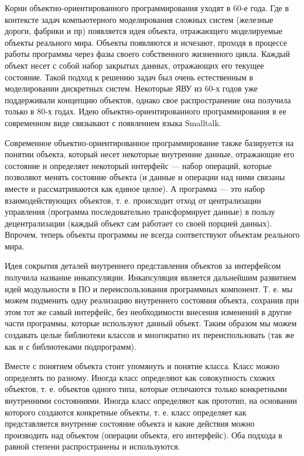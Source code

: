 Корни объектно-ориентированного программирования уходят в 60-е года. Где в контексте задач компьютерного моделирования сложных систем (железные дороги, фабрики и пр) появляется идея объекта, отражающего моделируемые объекты реального мира. Объекты появляются и исчезают, проходя в процессе работы программы через фазы своего собственного жизненного цикла. Каждый объект несет с собой набор закрытых данных, отражающих его текущее состояние. Такой подход к решению задач был очень естественным в моделировании дискретных систем. Некоторые ЯВУ из 60-х годов уже поддерживали концепцию объектов, однако свое распространение она получила только в 80-х годах. Идею объектно-ориентированного программирования в ее современном виде связывают с появлением языка Smalltalk.

Современное объектно-ориентированное программирование также базируется на понятии объекта, который несет некоторые внутренние данные, отражающие его состояние и определяет некоторый интерфейс — набор операций, которые позволяют менять состояние объекта (и данные и операции над ними связаны вместе и рассматриваются как единое целое). А программа — это набор взаимодействующих объектов, т. е. происходит отход от централизации управления (программа последовательно трансформирует данные) в пользу децентрализации (каждый объект сам работает со своей порцией данных). Впрочем, теперь объекты программы не всегда соответствуют объектам реального мира.

Идея сокрытия деталей внутреннего представления объектов за интерфейсом получила название инкапсуляции. Инкапсуляция является дальнейшим развитием идей модульности в ПО и переиспользования программных компонент. Т. е. мы можем подменить одну реализацию внутреннего состояния объекта, сохранив при этом тот же самый интерфейс, без необходимости внесения изменений в другие части программы, которые используют данный объект. Таким образом мы можем создавать целые библиотеки классов и многократно их переиспользовать (так же как и с библиотеками подпрограмм).

Вместе с понятием объекта стоит упомянуть и понятие класса. Класс можно определять по разному. Иногда класс определяют как совокупность схожих объектов, т. е. объектов одного типа, которые отличаются только конкретными внутренними состояниями. Иногда класс определяют как прототип, на основании которого создаются конкретные объекты, т. е. класс определяет как представляется внутренне состояние объекта и какие действия можно производить над объектом (операции объекта, его интерфейс). Оба подхода в равной степени распространены и используются.


